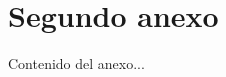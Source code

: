 \documentclass[../main.tex]{subfiles}
\begin{document}
\chapter{Segundo anexo}

Contenido del anexo...
\end{document}
